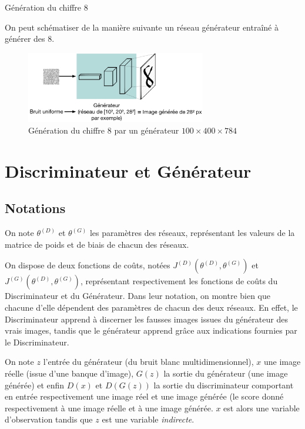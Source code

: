 \begin{example} Génération du chiffre 8

On peut schématiser de la manière suivante un réseau générateur entraîné à générer des 8.
\begin{figure}[h]
\begin{center}
\includegraphics[width=0.7\textwidth]{images/Colloque/GAN/generateur.png}\caption{Génération du chiffre 8 par un générateur $100\times 400\times 784$}
\end{center}
\end{figure} 
\end{example}
\section{Discriminateur et Générateur}
\subsection{Notations}
On note $\theta^{(D)}$ et $\theta^{(G)}$ les paramètres des réseaux, représentant les valeurs de la matrice de poids et de biais de chacun des réseaux.

On dispose de deux fonctions de coûts, notées $J^{(D)}(\theta^{(D)}, \theta^{(G)})$ et $J^{(G)}(\theta^{(D)}, \theta^{(G)})$, représentant respectivement les fonctions de coûts du Discriminateur et du Générateur. Dans leur notation, on montre bien que chacune d'elle dépendent des paramètres de chacun des deux réseaux. En effet, le Discriminateur apprend à discerner les fausses images issues du générateur des vrais images, tandis que le générateur apprend grâce aux indications fournies par le Discriminateur.

On note $z$ l'entrée du générateur (du bruit blanc multidimensionnel), $x$ une image réelle (issue d'une banque d'image), $G(z)$ la sortie du générateur (une image générée) et enfin $D(x)$ et $D(G(z))$ la sortie du discriminateur comportant en entrée respectivement une image réel et une image générée (le score donné respectivement à une image réelle et à une image générée. $x$ est alors une variable d'observation tandis que $z$ est une variable \textit{indirecte}.

